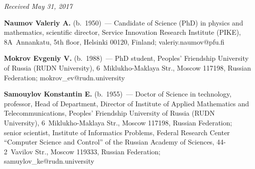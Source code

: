 \vspace*{-6pt}

\hfill{\small\textit{Received May 31, 2017}}


\Contr


\noindent
\textbf{Naumov Valeriy A.} (b.\ 1950)~--- Candidate of Science (PhD) in physics 
and mathematics, 
scientific director, Service Innovation Research Institute (PIKE), 8A~Annankatu, 5th floor,  
Helsinki 00120, Finland; \mbox{valeriy.naumov@pfu.fi} 

\vspace*{3pt}

\noindent
\textbf{Mokrov Evgeniy V.} (b.\ 1988)~--- PhD student, Peoples' Friendship University of Russia 
(RUDN University), 6~Miklukho-Maklaya Str., Moscow 117198, Russian Federation; 
\mbox{mokrov\_ev@rudn.university} 

\vspace*{3pt}

\noindent
\textbf{Samouylov Konstantin E.} (b.\ 1955)~--- Doctor of Science in technology, professor, Head of 
Department, Director of Institute of Applied Mathematics and Telecommunications, Peoples' 
Friendship University of Russia (RUDN University), 6~Miklukho-Maklaya Str., Moscow 117198, 
Russian Federation; senior scientist, Institute of Informatics Problems, Federal Research Center 
``Computer Science and Control'' of the Russian Academy of Sciences, 44-2~Vavilov Str., Moscow 
119333, Russian Federation; \mbox{samuylov\_ke@rudn.university}

\label{end\stat}


\renewcommand{\bibname}{\protect\rm Литература} 